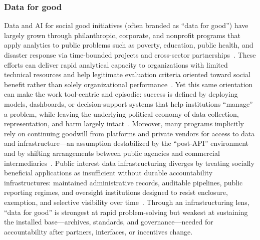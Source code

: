 \documentclass[acmsmall,screen]{acmart}
\begin{document}
\subsubsection*{Data for good}
Data and AI for social good initiatives (often branded as ``data for good'') have largely grown through philanthropic, corporate, and nonprofit programs that apply analytics to public problems such as poverty, education, public health, and disaster response via time-bounded projects and cross-sector partnerships~\cite{williamsDataActionUsing2022,cowlsAISocialGood2021,aulaSteppingBackData2023}. These efforts can deliver rapid analytical capacity to organizations with limited technical resources and help legitimate evaluation criteria oriented toward social benefit rather than solely organizational performance~\cite{cowlsAISocialGood2021}. Yet this same orientation can make the work tool-centric and episodic: success is defined by deploying models, dashboards, or decision-support systems that help institutions ``manage'' a problem, while leaving the underlying political economy of data collection, representation, and harm largely intact~\cite{floridiHowDesignAI2020}. Moreover, many programs implicitly rely on continuing goodwill from platforms and private vendors for access to data and infrastructure---an assumption destabilized by the ``post-API'' environment and by shifting arrangements between public agencies and commercial intermediaries~\cite{Freelon_ComputationalResearchPostAPI_2018,Bruns_APIcalypsesocialmedia_2019,taylorPublicActorsPublic2021}. Public interest data infrastructuring diverges by treating socially beneficial applications as insufficient without durable accountability infrastructures: maintained administrative records, auditable pipelines, public reporting regimes, and oversight institutions designed to resist enclosure, exemption, and selective visibility over time~\cite{schwartz_archives_2002,stoler_ColonialArchivesArts_2002,acker_DataCraftTheory_2019}. Through an infrastructuring lens, ``data for good'' is strongest at rapid problem-solving but weakest at sustaining the installed base---archives, standards, and governance---needed for accountability after partners, interfaces, or incentives change.
\end{document}
